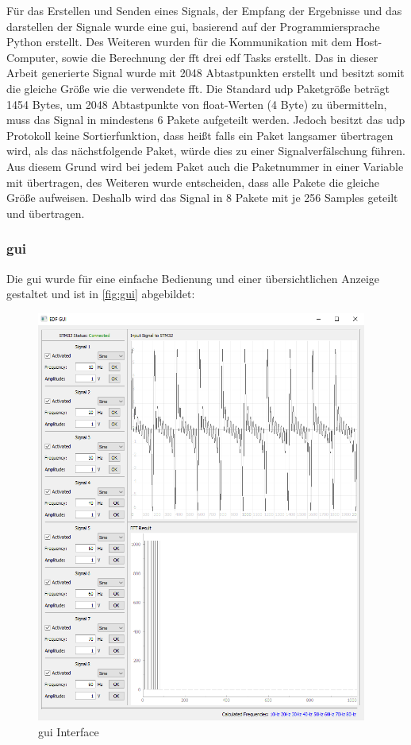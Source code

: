 \documentclass[../EDF Master Thesis.tex]{subfiles}
\begin{document}
        Für das Erstellen und Senden eines Signals, der Empfang der Ergebnisse und das darstellen der Signale wurde eine \ac{gui}, basierend auf der Programmiersprache Python erstellt.
        Des Weiteren wurden für die Kommunikation mit dem Host-Computer, sowie die Berechnung der \ac{fft} drei \ac{edf} Tasks erstellt.
        Das in dieser Arbeit generierte Signal wurde mit 2048 Abtastpunkten erstellt und besitzt somit die gleiche Größe wie die verwendete \ac{fft}.
        Die Standard \ac{udp} Paketgröße beträgt 1454 Bytes, um 2048 Abtastpunkte von float-Werten (4 Byte) zu übermitteln, muss das Signal in mindestens 6 Pakete aufgeteilt werden.
        Jedoch besitzt das \ac{udp} Protokoll keine Sortierfunktion, dass heißt falls ein Paket langsamer übertragen wird, als das nächstfolgende Paket, würde dies zu einer Signalverfälschung führen.
        Aus diesem Grund wird bei jedem Paket auch die Paketnummer in einer Variable mit übertragen, des Weiteren wurde entscheiden, dass alle Pakete die gleiche Größe aufweisen.
        Deshalb wird das Signal in 8 Pakete mit je 256 Samples geteilt und übertragen.

        \clearpage
        \subsubsection{\ac{gui}}
            Die \ac{gui} wurde für eine einfache Bedienung und einer übersichtlichen Anzeige gestaltet und ist in \autoref{fig:gui} abgebildet:

            \begin{figure}[H]
                \centering
                \includegraphics[width=0.97\textwidth]{./attachments/gui.png}
                \caption{\ac{gui} Interface}
                \label{fig:gui}
            \end{figure}
\end{document}
